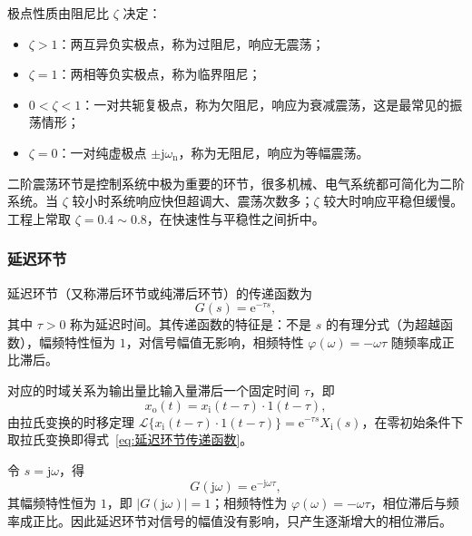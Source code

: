 \begin{definition}[阻尼比与响应类型]
    极点性质由阻尼比 $\zeta$ 决定：
    \begin{itemize}
        \item $\zeta>1$：两互异负实极点，称为过阻尼，响应无震荡；
        \item $\zeta=1$：两相等负实极点，称为临界阻尼；
        \item $0<\zeta<1$：一对共轭复极点，称为欠阻尼，响应为衰减震荡，这是最常见的振荡情形；
        \item $\zeta=0$：一对纯虚极点 $\pm\mathrm{j}\omega_{\mathrm{n}}$，称为无阻尼，响应为等幅震荡。
    \end{itemize}
\end{definition}


\begin{remark}
    二阶震荡环节是控制系统中极为重要的环节，很多机械、电气系统都可简化为二阶系统。当 $\zeta$ 较小时系统响应快但超调大、震荡次数多；$\zeta$ 较大时响应平稳但缓慢。工程上常取 $\zeta=0.4\sim0.8$，在快速性与平稳性之间折中。
\end{remark}

\subsubsection{延迟环节}

\begin{definition}[延迟环节]
    延迟环节（又称滞后环节或纯滞后环节）的传递函数为
    \begin{equation}
        G(s)=\mathrm{e}^{-\tau s},
        \label{eq:延迟环节传递函数}
    \end{equation}
    其中 $\tau>0$ 称为延迟时间。其传递函数的特征是：不是 $s$ 的有理分式（为超越函数），幅频特性恒为 $1$，对信号幅值无影响，相频特性 $\varphi(\omega)=-\omega\tau$ 随频率成正比滞后。
\end{definition}

对应的时域关系为输出量比输入量滞后一个固定时间 $\tau$，即
\begin{equation}
    x_{\mathrm{o}}(t)=x_{\mathrm{i}}(t-\tau)\cdot 1(t-\tau),
    \label{eq:延迟环节时域}
\end{equation}
由拉氏变换的时移定理 $\mathcal{L}\{x_{\mathrm{i}}(t-\tau)\cdot 1(t-\tau)\}=\mathrm{e}^{-\tau s}X_{\mathrm{i}}(s)$，在零初始条件下取拉氏变换即得式~\eqref{eq:延迟环节传递函数}。

\begin{property}[延迟环节的幅频与相频特性]
    令 $s=\mathrm{j}\omega$，得
    \[
    G(\mathrm{j}\omega)=\mathrm{e}^{-\mathrm{j}\omega\tau},
    \]
    其幅频特性恒为 $1$，即 $|G(\mathrm{j}\omega)|=1$；相频特性为 $\varphi(\omega)=-\omega\tau$，相位滞后与频率成正比。因此延迟环节对信号的幅值没有影响，只产生逐渐增大的相位滞后。
\end{property}


